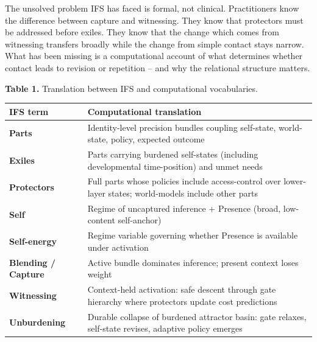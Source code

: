 \documentclass[11pt,a4paper]{article}
\newcounter{none}
\begin{document}
The unsolved problem IFS has faced is formal, not clinical.
Practitioners know the difference between capture and witnessing. They
know that protectors must be addressed before exiles. They know that the
change which comes from witnessing transfers broadly while the change
from simple contact stays narrow. What has been missing is a
computational account of what determines whether contact leads to
revision or repetition -- and why the relational structure matters.

\textbf{Table 1.} Translation between IFS and computational
vocabularies.

{\def\LTcaptype{none} %
\begin{longtable}[]{@{}
  >{\raggedright\arraybackslash}p{}
  >{\raggedright\arraybackslash}p{}@{}}
\toprule\noalign{}
\begin{minipage}[b]{\linewidth}\raggedright
IFS term
\end{minipage} & \begin{minipage}[b]{\linewidth}\raggedright
Computational translation
\end{minipage} \\
\midrule\noalign{}
\endhead
\bottomrule\noalign{}
\endlastfoot
\textbf{Parts} & Identity-level precision bundles coupling self-state,
world-state, policy, expected outcome \\
\textbf{Exiles} & Parts carrying burdened self-states (including
developmental time-position) and unmet needs \\
\textbf{Protectors} & Full parts whose policies include access-control
over lower-layer states; world-models include other parts \\
\textbf{Self} & Regime of uncaptured inference + Presence (broad,
low-content self-anchor) \\
\textbf{Self-energy} & Regime variable governing whether Presence is
available under activation \\
\textbf{Blending / Capture} & Active bundle dominates inference; present
context loses weight \\
\textbf{Witnessing} & Context-held activation: safe descent through gate
hierarchy where protectors update cost predictions \\
\textbf{Unburdening} & Durable collapse of burdened attractor basin:
gate relaxes, self-state revises, adaptive policy emerges \\
\end{longtable}
}
\end{document}
